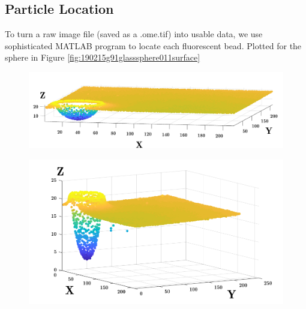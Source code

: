 \subsection{Particle Location}
To turn a raw image file (saved as a .ome.tif) into usable data, we use sophisticated MATLAB program to locate each fluorescent bead. Plotted for the sphere in Figure \ref{fig:190215g91glasssphere011surface}
\begin{figure}[h!]
	\centering
	\includegraphics[width=\linewidth]{Chapters/Figures/sphere011_ia/particle_located_normalized}
	\caption[Particle Located: Normalized-Axes]{}
	\label{fig:particlelocatednormalized}
\end{figure}
\begin{figure}[h!]
	\centering
	\includegraphics[width=\linewidth]{Chapters/Figures/sphere011_ia/particle_located_stretched}
	\caption[Particle Located: Stretched-Axes]{}
	\label{fig:particlelocatedstretched}
\end{figure}




